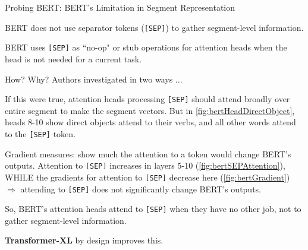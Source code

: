 \begin{frame}{Probing BERT: BERT's Limitation in Segment Representation}
    \normalsize
    \linespread{0.4}
    
    \begin{itemizeSpaced}{10pt}
        \item BERT does not use separator tokens (\texttt{[SEP]}) to gather segment-level information. 
        
        \pinkbox BERT uses \texttt{[SEP]} as ``no-op" or stub operations for attention heads when the head is not needed for a current task. 
        
        \item How? Why? Authors investigated in two ways ...
        
        \begin{itemizeSpaced}{10pt}
        
        \normalsize \linespread{0.4}
        
            \item If this were true, attention heads processing \texttt{[SEP]} should attend broadly over entire segment to make the segment vectors. But in \cref{fig:bertHeadDirectObject}, heads 8-10 show direct objects attend to their verbs, and all other words attend to the \texttt{[SEP]} token. 
            
            \item Gradient measures: show much the attention to a token would change BERT's outputs. Attention to \texttt{[SEP]} increases in layers 5-10 (\cref{fig:bertSEPAttention}), WHILE the gradients for attention to \texttt{[SEP]} decrease here (\cref{fig:bertGradient})  $\Rightarrow$ attending to \texttt{[SEP]} does not significantly change BERT's outputs. 
        \end{itemizeSpaced}
    \end{itemizeSpaced}
    


So, BERT's attention heads attend to \texttt{[SEP]} when they have no other job, not to gather segment-level information. 

\textbf{Transformer-XL} by design improves this.

\end{frame}





